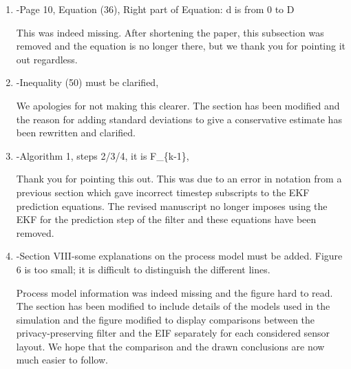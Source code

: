 \documentclass[a4paper]{scrartcl}
\newenvironment{rebuttal}{\begin{enumerate}[label={\color{grey}\thesection.\arabic{enumi}},leftmargin=0pt,ref=\thesection.\arabic{enumi}]}{\end{enumerate}}
\newcommand{\reviewtext}[1]{{\color{nblue} #1}}
\begin{document}
\begin{rebuttal}
Due to the number of components in the proposed method (encoding, encryption and estimation), we aimed to present the algorithm pseudocode as the summary of the method, and regret that this was not made clearer. We have rewritten and reorganised the localisation section and have tried to make a pseudocode summary, and its purpose, clearer. We hope that the updated manuscript now presents a better overall summary after all the components are presented.

\item \reviewtext{-Page 10, Equation (36), Right part of Equation: d is from 0 to D}

This was indeed missing. After shortening the paper, this subsection was removed and the equation is no longer there, but we thank you for pointing it out regardless. 

\item \reviewtext{-Inequality (50) must be clarified,}

We apologies for not making this clearer. The section has been modified and the reason for adding standard deviations to give a conservative estimate has been rewritten and clarified.

\item \reviewtext{-Algorithm 1, steps 2/3/4, it is F\_\{k-1\},}

Thank you for pointing this out. This was due to an error in notation from a previous section which gave incorrect timestep subscripts to the EKF prediction equations. The revised manuscript no longer imposes using the EKF for the prediction step of the filter and these equations have been removed.

\item \reviewtext{-Section VIII-some explanations on the process model must be added. Figure 6 is too small; it is difficult to distinguish the different lines.}

Process model information was indeed missing and the figure hard to read. The section has been modified to include details of the models used in the simulation and the figure modified to display comparisons between the privacy-preserving filter and the EIF separately for each considered sensor layout. We hope that the comparison and the drawn conclusions are now much easier to follow.

\end{rebuttal}

\end{document}
